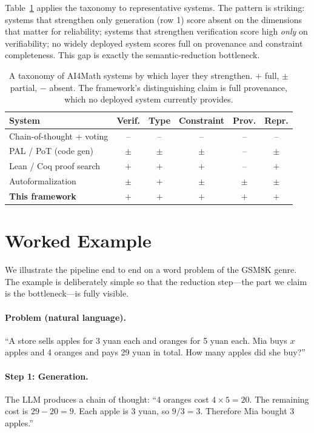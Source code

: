 \documentclass[11pt]{article}
\begin{document}
Table~\ref{tab:taxonomy} applies the taxonomy to representative systems. The pattern is striking: systems that strengthen only generation (row 1) score absent on the dimensions that matter for reliability; systems that strengthen verification score high \emph{only} on verifiability; no widely deployed system scores full on provenance and constraint completeness. This gap is exactly the semantic-reduction bottleneck.

\begin{table}[h]
\centering
\small
\begin{tabular}{@{}lccccc@{}}
\toprule
\textbf{System} & Verif. & Type & Constraint & Prov. & Repr. \\
\midrule
Chain-of-thought + voting & -- & -- & -- & -- & -- \\
PAL / PoT (code gen) & $\pm$ & $\pm$ & $\pm$ & -- & $\pm$ \\
Lean / Coq proof search & $+$ & $+$ & $+$ & -- & $+$ \\
Autoformalization & $\pm$ & $+$ & $\pm$ & $\pm$ & $\pm$ \\
\textbf{This framework} & $+$ & $+$ & $+$ & $+$ & $+$ \\
\bottomrule
\end{tabular}
\caption{A taxonomy of AI4Math systems by which layer they strengthen. $+$ full, $\pm$ partial, $-$ absent. The framework's distinguishing claim is full provenance, which no deployed system currently provides.}
\label{tab:taxonomy}
\end{table}

\section{Worked Example}
We illustrate the pipeline end to end on a word problem of the GSM8K genre. The example is deliberately simple so that the reduction step---the part we claim is the bottleneck---is fully visible.

\paragraph{Problem (natural language).}
``A store sells apples for 3 yuan each and oranges for 5 yuan each. Mia buys $x$ apples and 4 oranges and pays 29 yuan in total. How many apples did she buy?''

\paragraph{Step 1: Generation.}
The LLM produces a chain of thought: ``4 oranges cost $4 \times 5 = 20$. The remaining cost is $29 - 20 = 9$. Each apple is 3 yuan, so $9 / 3 = 3$. Therefore Mia bought 3 apples.''
\end{document}
